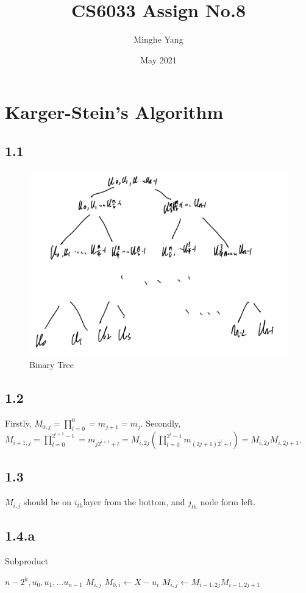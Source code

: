 \documentclass{article}
\title{CS6033 Assign No.8}
\author{Minghe Yang}
\date{May 2021}
\begin{document}
\renewcommand{\algorithmicrequire}{\textbf{Input:}} 
\renewcommand{\algorithmicensure}{\textbf{Output:}}
\maketitle

\section{Karger-Stein's Algorithm}
\subsection*{1.1}
\begin{figure}[h]
    \centering
    \includegraphics[scale=0.3]{h801.jpg}
    \caption{Binary Tree}
\end{figure}
\subsection*{1.2}
Firstly, $M_{0,j} = \prod_{l = 0}^{0} = m_{j+1} = m_j$.
\newline
Secondly, $M_{i+1,j} = \prod_{l = 0}^{2^{i+1}-1} = m_{j2^{i+1}+l} = M_{i, 2j}(\prod_{l = 0}^{2^i-1}m_{(2j+1)2^i+l}) = M_{i, 2j}M_{i, 2j +1}$.
\subsection*{1.3}
$M_{i,j}$ should be on $i_{th}$layer from the bottom, and $j_{th}$ node form left.
\subsection*{1.4.a}
\begin{algorithm}
    \caption{Subproduct}
    \begin{algorithmic}[1]
    \Require $n- 2^k,{u_0, u_1, \dots u_{n-1}}$ 
    \Ensure $M_{i, j}$
        \State $M_{0, i}\gets X-u_i$
    \EndFor
            \State $M_{i, j}\gets M_{i-1, 2j}M_{i-1, 2j+1}$
        \EndFor
    \EndFor
    \end{algorithmic}
\end{algorithm}
\end{document}
